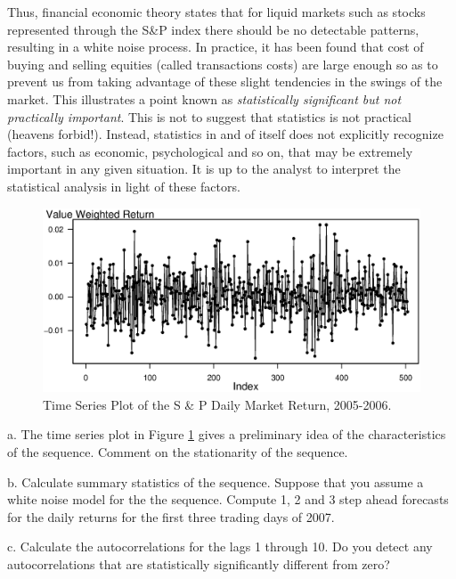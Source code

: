\begin{exercises}
Thus, financial economic theory states that for liquid markets such
as stocks represented through the S\&P index there should be no
detectable patterns, resulting in a white noise process. In
practice, it has been found that cost of buying and selling equities
(called transactions costs) are large enough so as to prevent us
from taking advantage of these slight tendencies in the swings of
the market. This illustrates a point known as \emph{statistically
significant but not practically important}. This is not to suggest
that statistics is not practical (heavens forbid!). Instead,
statistics in and of itself does not explicitly recognize factors,
such as economic, psychological and so on, that may be extremely
important in any given situation. It is up to the analyst to
interpret the statistical analysis in light of these
factors.\bigskip


\begin{figure}[htp]
  \begin{center}
   \includegraphics[width=.8\textwidth]{Chapter8AutoReg/ValueWgtReturn.eps}
      \caption{\label{F8:SPValue} \small Time Series Plot of the S \& P Daily Market Return, 2005-2006.}
      \end{center}
\end{figure}


a. The time series plot in Figure \ref{F8:SPValue} gives a
preliminary idea of the characteristics of the sequence. Comment on
the stationarity of the sequence.

b. Calculate summary statistics of the sequence. Suppose that you assume a
white noise model for the the sequence. Compute 1, 2 and 3 step ahead
forecasts for the daily returns for the first three trading days of 2007.

c. Calculate the autocorrelations for the lags 1 through 10. Do you detect
any autocorrelations that are statistically significantly different from
zero?


\end{exercises}
